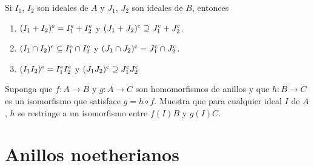 \ExerciseSection

\begin{ExerciseList}
  \item Si $I_1$, $I_2$ son ideales de $A$ y $J_1$, $J_2$ son ideales de $B$, entonces
    \begin{enumerate}
      \item $(I_1+I_2)^{\mathrm{e}} = I_1^{\mathrm{e}} + I_2^{\mathrm{e}}$ y $(J_1+J_2)^{\mathrm{c}} \supseteq J_1^{\mathrm{c}} + J_2^{\mathrm{c}}$.
      \item $(I_1 \cap I_2)^{\mathrm{e}} \subseteq I_1^{\mathrm{e}} \cap I_2^{\mathrm{e}}$ y $(J_1 \cap J_2)^{\mathrm{c}} = J_1^{\mathrm{c}} \cap J_2^{\mathrm{c}}$.
      \item $(I_1 I_2)^{\mathrm{e}} = I_1^{\mathrm{e}} I_2^{\mathrm{e}}$ y $(J_1 J_2)^{\mathrm{c}} \supseteq J_1^{\mathrm{c}} J_2^{\mathrm{c}}$
    \end{enumerate}

  \item Suponga que $f\colon A \to B $ y $g\colon A \to C$ son homomorfismos de anillos y que $h\colon B \to C$ es un isomorfismo que satisface $g = h \circ f$. Muestra que para cualquier ideal $I$ de $A$, $h$ se restringe a un isomorfismo entre $f(I)B$ y $g(I)C$.
\end{ExerciseList}




\section{Anillos noetherianos}

